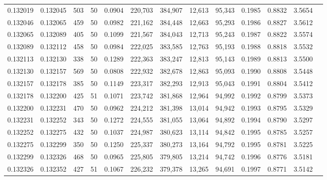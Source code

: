 \begin{tabular}{rrrrrrrrrrrrr}
0.132019 & 0.132045 &   503 &  50 &                                     0.0904 & 220,703 & 384,907 &  12,613 &  95,343 & 0.1985 & 0.8832 & 3.5654 \\
0.132046 & 0.132065 &   459 &  50 &                                     0.0982 & 221,162 & 384,448 &  12,663 &  95,293 & 0.1986 & 0.8827 & 3.5612 \\
0.132065 & 0.132089 &   405 &  50 &                                     0.1099 & 221,567 & 384,043 &  12,713 &  95,243 & 0.1987 & 0.8822 & 3.5574 \\
0.132089 & 0.132112 &   458 &  50 &                                     0.0984 & 222,025 & 383,585 &  12,763 &  95,193 & 0.1988 & 0.8818 & 3.5532 \\
0.132113 & 0.132130 &   338 &  50 &                                     0.1289 & 222,363 & 383,247 &  12,813 &  95,143 & 0.1989 & 0.8813 & 3.5500 \\
0.132130 & 0.132157 &   569 &  50 &                                     0.0808 & 222,932 & 382,678 &  12,863 &  95,093 & 0.1990 & 0.8808 & 3.5448 \\
0.132157 & 0.132178 &   385 &  50 &                                     0.1149 & 223,317 & 382,293 &  12,913 &  95,043 & 0.1991 & 0.8804 & 3.5412 \\
0.132178 & 0.132200 &   425 &  51 &                                     0.1071 & 223,742 & 381,868 &  12,964 &  94,992 & 0.1992 & 0.8799 & 3.5373 \\
0.132200 & 0.132231 &   470 &  50 &                                     0.0962 & 224,212 & 381,398 &  13,014 &  94,942 & 0.1993 & 0.8795 & 3.5329 \\
0.132231 & 0.132252 &   343 &  50 &                                     0.1272 & 224,555 & 381,055 &  13,064 &  94,892 & 0.1994 & 0.8790 & 3.5297 \\
0.132252 & 0.132275 &   432 &  50 &                                     0.1037 & 224,987 & 380,623 &  13,114 &  94,842 & 0.1995 & 0.8785 & 3.5257 \\
0.132275 & 0.132299 &   350 &  50 &                                     0.1250 & 225,337 & 380,273 &  13,164 &  94,792 & 0.1995 & 0.8781 & 3.5225 \\
0.132299 & 0.132326 &   468 &  50 &                                     0.0965 & 225,805 & 379,805 &  13,214 &  94,742 & 0.1996 & 0.8776 & 3.5181 \\
0.132326 & 0.132352 &   427 &  51 &                                     0.1067 & 226,232 & 379,378 &  13,265 &  94,691 & 0.1997 & 0.8771 & 3.5142 \\

\end{tabular}
